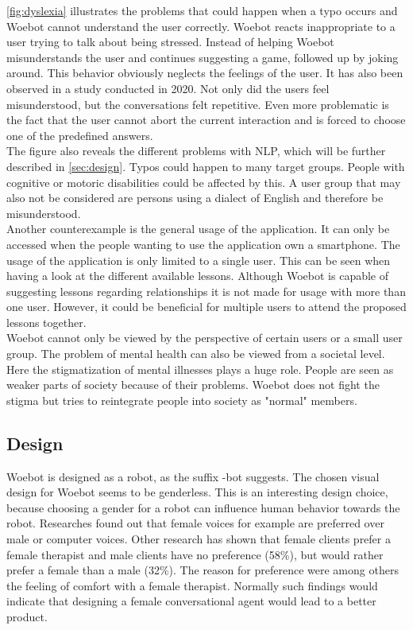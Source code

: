\autoref{fig:dyslexia} illustrates the problems that could happen when a typo occurs and Woebot cannot understand the user correctly.
Woebot reacts inappropriate to a user trying to talk about being stressed.
Instead of helping Woebot misunderstands the user and continues suggesting a game, followed up by joking around.
This behavior obviously neglects the feelings of the user.
It has also been observed in a study conducted in 2020\cite{investigating-students}.
Not only did the users feel misunderstood, but the conversations felt repetitive.
Even more problematic is the fact that the user cannot abort the current interaction and is forced to choose one of the predefined answers.\\

The figure also reveals the different problems with NLP, which will be further described in \autoref{sec:design}.
Typos could happen to many target groups.
People with cognitive or motoric disabilities could be affected by this.
A user group that may also not be considered are persons using a dialect of English and therefore be misunderstood.\\

Another counterexample is the general usage of the application.
It can only be accessed when the people wanting to use the application own a smartphone.
The usage of the application is only limited to a single user.
This can be seen when having a look at the different available lessons.
Although Woebot is capable of suggesting lessons regarding relationships it is not made for usage with more than one user.
However, it could be beneficial for multiple users to attend the proposed lessons together.\\

Woebot cannot only be viewed by the perspective of certain users or a small user group.
The problem of mental health can also be viewed from a societal level.
Here the stigmatization of mental illnesses plays a huge role\cite{stigmatization}.
People are seen as weaker parts of society because of their problems.
Woebot does not fight the stigma but tries to reintegrate people into society as "normal" members.


\subsection{Design}\label{sec:design}
Woebot is designed as a robot, as the suffix -bot suggests.
The chosen visual design for Woebot seems to be genderless.
This is an interesting design choice, because choosing a gender for a robot can influence human behavior towards the robot.
Researches found out that female voices for example are preferred over male or computer voices\cite{bias-robot}.
Other research has shown that female clients prefer a female therapist and male clients have no preference (58\%), but would rather prefer a female than a male (32\%)\cite{client-gender-preference}.
The reason for preference were among others the feeling of comfort with a female therapist.
Normally such findings would indicate that designing a female conversational agent would lead to a better product.\\

